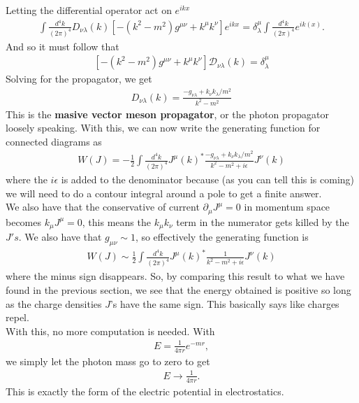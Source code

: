 \documentclass{book}
\theoremstyle{definition}
\newcommand{\p}{\partial}
\newcommand{\f}[2]{\frac{#1}{#2}}
\newcommand{\lb}{\left[}
\newcommand{\rb}{\right]}
\newcommand{\D}{\mathcal{D}}
\begin{document}
Letting the differential operator act on $e^{ikx}$
\begin{align}
\int \f{d^4k}{(2\pi)^4}D_{\nu\lambda}(k) \lb -(k^2 - m^2)g^{\mu\nu} + k^\mu k^\nu \rb e^{ikx} = \delta^\mu_\lambda \int \f{d^4k}{(2\pi)^4}e^{ik(x)}.
\end{align}
And so it must follow that
\begin{align}
\lb -(k^2 - m^2)g^{\mu\nu} + k^\mu k^\nu \rb \D_{\nu\lambda}(k) = \delta^{\mu}_\lambda
\end{align}
Solving for the propagator, we get
\begin{align}
\boxed{D_{\nu\lambda}(k) = \f{-g_{\nu\lambda} + k_\nu k_\lambda / m^2}{k^2 - m^2}}
\end{align}
This is the \textbf{masive vector meson propagator}, or the photon propagator loosely speaking. With this, we can now write the generating function for connected diagrams as
\begin{align}
W(J) = -\f{1}{2}\int \f{d^4k}{(2\pi)^4}J^\mu(k)^*\f{-g_{\nu\lambda} + k_\nu k_\lambda / m^2}{k^2 - m^2 + i\epsilon} J^\nu(k)
\end{align}
where the $i\epsilon$ is added to the denominator because (as you can tell this is coming) we will need to do a contour integral around a pole to get a finite answer. \\

We also have that the conservative of current $\p_\mu J^\mu = 0$ in momentum space becomes $k_\mu J^\mu = 0$, this means the $k_\mu k_\nu$ term in the numerator gets killed by the $J's$. We also have that $g_{\mu\nu} \sim 1$, so effectively the generating function is 
\begin{align}
W(J) \sim \f{1}{2}\int \f{d^4k}{(2\pi)^4}J^\mu(k)^*\f{1}{k^2 - m^2 + i\epsilon} J^\nu(k)
\end{align}
where the minus sign disappears. So, by comparing this result to what we have found in the previous section, we see that the energy obtained is positive so long as the charge densities $J$'s have the same sign. This basically says like charges repel. \\

With this, no more computation is needed. With
\begin{align}
E = \f{1}{4\pi r}e^{-mr},
\end{align} 
we simply let the photon mass go to zero to get
\begin{align}
E \to \f{1}{4\pi r}.
\end{align}
This is exactly the form of the electric potential in electrostatics.
\end{document}
